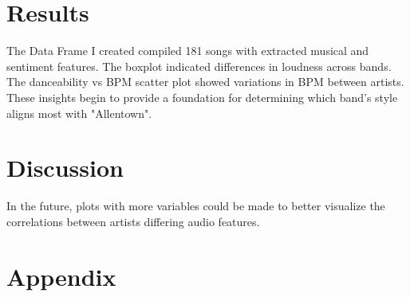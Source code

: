 \documentclass{article}\usepackage[]{graphicx}\usepackage[]{xcolor}
\begin{document}
\begin{multicols}{2}
\section{Results}

The Data Frame I created compiled 181 songs with extracted musical and sentiment features. The boxplot indicated differences in loudness across bands. The danceability vs BPM scatter plot showed variations in BPM between artists. These insights begin to provide a foundation for determining which band's style aligns most with "Allentown".


\section{Discussion}

In the future, plots with more variables could be made to better visualize the correlations between artists differing audio features.

\vspace{2em}

\begin{tiny}

\end{tiny}
\end{multicols}

\newpage
\onecolumn
\section{Appendix}
\end{document}
